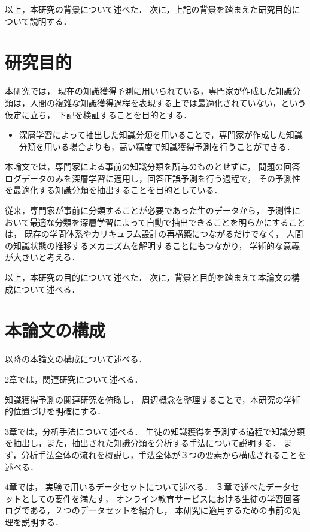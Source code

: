 \vvspace
以上，本研究の背景について述べた．
次に，上記の背景を踏まえた研究目的について説明する．

\section{研究目的}
本研究では，
現在の知識獲得予測に用いられている，専門家が作成した知識分類は，人間の複雑な知識獲得過程を表現する上では最適化されていない，という仮定に立ち，
下記を検証することを目的とする．

\begin{itemize}
\item 深層学習によって抽出した知識分類を用いることで，専門家が作成した知識分類を用いる場合よりも，高い精度で知識獲得予測を行うことができる．
\end{itemize}

本論文では，専門家による事前の知識分類を所与のものとせずに，
問題の回答ログデータのみを深層学習に適用し，回答正誤予測を行う過程で，
その予測性を最適化する知識分類を抽出することを目的としている．

従来，専門家が事前に分類することが必要であった生のデータから，
予測性において最適な分類を深層学習によって自動で抽出できることを明らかにすることは，
既存の学問体系やカリキュラム設計の再構築につながるだけでなく，
人間の知識状態の推移するメカニズムを解明することにもつながり，
学術的な意義が大きいと考える．


\vvspace
以上，本研究の目的について述べた．
次に，背景と目的を踏まえて本論文の構成について述べる．



\section{本論文の構成}
以降の本論文の構成について述べる．

2章では，関連研究について述べる．

知識獲得予測の関連研究を俯瞰し，
周辺概念を整理することで，本研究の学術的位置づけを明確にする．


3章では，分析手法について述べる．
生徒の知識獲得を予測する過程で知識分類を抽出し，また，抽出された知識分類を分析する手法について説明する．
まず，分析手法全体の流れを概説し，手法全体が３つの要素から構成されることを述べる．


4章では，
実験で用いるデータセットについて述べる．
３章で述べたデータセットとしての要件を満たす，
オンライン教育サービスにおける生徒の学習回答ログである，２つのデータセットを紹介し，
本研究に適用するための事前の処理を説明する．


